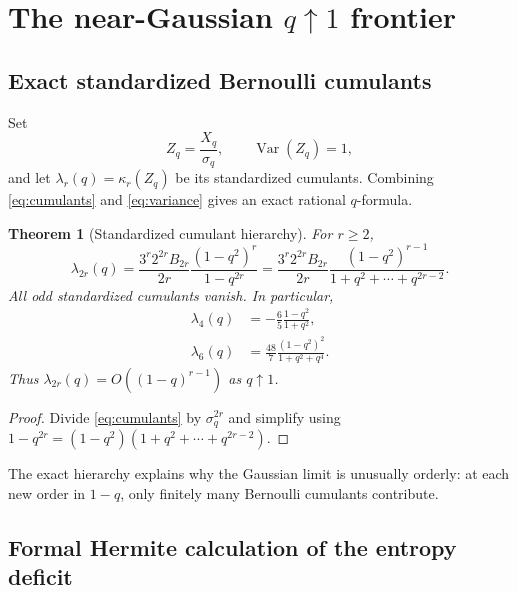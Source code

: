 \documentclass[11pt,oneside]{article}
\newtheorem{theorem}{Theorem}[section]
\theoremstyle{definition}
\theoremstyle{remark}
\newcommand{\Var}{\operatorname{Var}}
\begin{document}
\section{The near-Gaussian $q\uparrow1$ frontier}
\label{sec:q-gaussian}

\subsection{Exact standardized Bernoulli cumulants}

Set
\begin{equation}
 Z_q=\frac{X_q}{\sigma_q},
 \qquad \Var(Z_q)=1,
 \label{eq:Zq}
\end{equation}
and let $\lambda_r(q)=\kappa_r(Z_q)$ be its standardized cumulants.  Combining
\eqref{eq:cumulants} and \eqref{eq:variance} gives an exact rational $q$-formula.

\begin{theorem}[Standardized cumulant hierarchy]
\label{thm:standardized-cumulants}
For $r\ge2$,
\begin{equation}
 \boxed{
 \lambda_{2r}(q)
 =\frac{3^r2^{2r}B_{2r}}{2r}
   \frac{(1-q^2)^r}{1-q^{2r}}
 =\frac{3^r2^{2r}B_{2r}}{2r}
   \frac{(1-q^2)^{r-1}}{1+q^2+\cdots+q^{2r-2}}.}
 \label{eq:standardized-cumulants}
\end{equation}
All odd standardized cumulants vanish.  In particular,
\begin{align}
 \lambda_4(q)&=-\frac65\frac{1-q^2}{1+q^2},
 \label{eq:lambda4}\\
 \lambda_6(q)&=\frac{48}{7}
 \frac{(1-q^2)^2}{1+q^2+q^4}.
 \label{eq:lambda6}
\end{align}
Thus $\lambda_{2r}(q)=O((1-q)^{r-1})$ as $q\uparrow1$.
\end{theorem}

\begin{proof}
Divide \eqref{eq:cumulants} by $\sigma_q^{2r}$ and simplify using
$1-q^{2r}=(1-q^2)(1+q^2+\cdots+q^{2r-2})$.
\end{proof}

The exact hierarchy explains why the Gaussian limit is unusually orderly: at
each new order in $1-q$, only finitely many Bernoulli cumulants contribute.

\subsection{Formal Hermite calculation of the entropy deficit}
\end{document}
